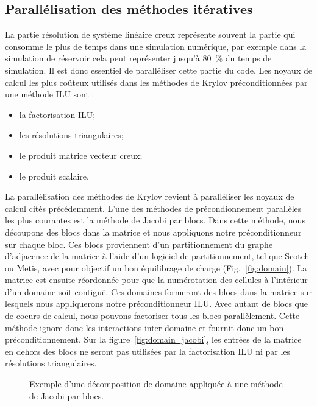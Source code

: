 \subsection{Parallélisation des méthodes itératives}
La partie résolution de système linéaire creux représente souvent la partie qui consomme le plus de temps dans une simulation numérique, par exemple dans la simulation de réservoir cela peut représenter jusqu'à 80~\% du temps de simulation.
%
Il est donc essentiel de paralléliser cette partie du code.
%
Les noyaux de calcul les plus coûteux utilisés dans les méthodes de Krylov préconditionnées par une méthode ILU sont :
\begin{itemize}
  \item la factorisation ILU;
  \item les résolutions triangulaires;
  \item le produit matrice vecteur creux;
  \item le produit scalaire.
\end{itemize}


La parallélisation des méthodes de Krylov revient à paralléliser les noyaux de calcul cités précédemment.
%
L'une des méthodes de précondionnement parallèles les plus courantes est la méthode de Jacobi par blocs.
%
Dans cette méthode, nous découpons des blocs dans la matrice et nous appliquons notre préconditionneur sur chaque bloc.
%
Ces blocs proviennent d'un partitionnement du graphe d'adjacence de la matrice à l'aide d'un logiciel de partitionnement, tel que Scotch ou Metis, avec pour objectif un bon équilibrage de charge (Fig.~\ref{fig:domain}).
%
La matrice est ensuite réordonnée pour que la numérotation des cellules à l'intérieur d'un domaine soit contiguë.
%
Ces domaines formeront des blocs dans la matrice sur lesquels nous appliquerons notre préconditionneur ILU.
%
Avec autant de blocs que de coeurs de calcul, nous pouvons factoriser tous les blocs parallèlement.
%
Cette méthode ignore donc les interactions inter-domaine et fournit donc un bon préconditionnement.
%
Sur la figure~\ref{fig:domain_jacobi}, les entrées de la matrice en dehors des blocs ne seront pas utilisées par la factorisation ILU ni par les résolutions triangulaires.
\begin{figure}[!h]
     \begin{center}
    \end{center}
    \caption{Exemple d'une décomposition de domaine appliquée à une méthode de Jacobi par blocs.}
    \label{fig:jacobi}
\end{figure}



